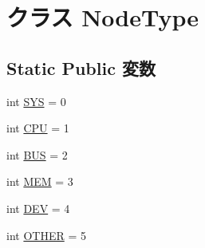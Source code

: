 \hypertarget{classm5_1_1util_1_1dot__writer_1_1NodeType}{
\section{クラス NodeType}
\label{classm5_1_1util_1_1dot__writer_1_1NodeType}
}
\subsection*{Static Public 変数}
\begin{DoxyCompactItemize}
\item 
int \hyperlink{classm5_1_1util_1_1dot__writer_1_1NodeType_a41ce7bce3c10dc9ba75edb9bf5892d45}{SYS} = 0
\item 
int \hyperlink{classm5_1_1util_1_1dot__writer_1_1NodeType_a3eed8c0857b3253830f8d5a02fe5e8bf}{CPU} = 1
\item 
int \hyperlink{classm5_1_1util_1_1dot__writer_1_1NodeType_a43a6b085d0ba34670220d0ff70a8ae83}{BUS} = 2
\item 
int \hyperlink{classm5_1_1util_1_1dot__writer_1_1NodeType_ac01988c3cc561edcfde19b2835ef6d4e}{MEM} = 3
\item 
int \hyperlink{classm5_1_1util_1_1dot__writer_1_1NodeType_ad69a3a321365c36051914a33e29a6e0e}{DEV} = 4
\item 
int \hyperlink{classm5_1_1util_1_1dot__writer_1_1NodeType_a91a779f23ea25f45c3c9a1bf1ee93f47}{OTHER} = 5
\end{DoxyCompactItemize}


